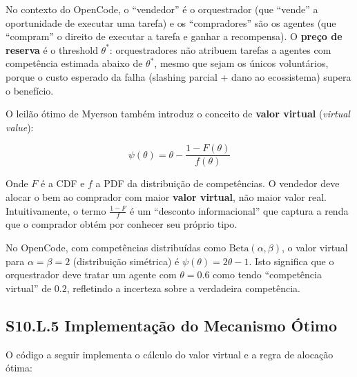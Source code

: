 No contexto do OpenCode, o ``vendedor'' é o orquestrador (que ``vende'' a oportunidade de executar uma tarefa) e os ``compradores'' são os agentes (que ``compram'' o direito de executar a tarefa e ganhar a recompensa). O \textbf{preço de reserva} é o threshold $\theta^*$: orquestradores não atribuem tarefas a agentes com competência estimada abaixo de $\theta^*$, mesmo que sejam os únicos voluntários, porque o custo esperado da falha (slashing parcial + dano ao ecossistema) supera o benefício.

O leilão ótimo de Myerson também introduz o conceito de \textbf{valor virtual} (\textit{virtual value}):

\begin{equation}\label{eq:virtual_value}
\psi(\theta) = \theta - \frac{1 - F(\theta)}{f(\theta)}
\end{equation}

Onde $F$ é a CDF e $f$ a PDF da distribuição de competências. O vendedor deve alocar o bem ao comprador com maior \textbf{valor virtual}, não maior valor real. Intuitivamente, o termo $\frac{1-F}{f}$ é um ``desconto informacional'' que captura a renda que o comprador obtém por conhecer seu próprio tipo.

No OpenCode, com competências distribuídas como $\text{Beta}(\alpha, \beta)$, o valor virtual para $\alpha = \beta = 2$ (distribuição simétrica) é $\psi(\theta) = 2\theta - 1$. Isto significa que o orquestrador deve tratar um agente com $\theta = 0.6$ como tendo ``competência virtual'' de $0.2$, refletindo a incerteza sobre a verdadeira competência.

\subsection*{S10.L.5 Implementação do Mecanismo Ótimo}

O código a seguir implementa o cálculo do valor virtual e a regra de alocação ótima:

